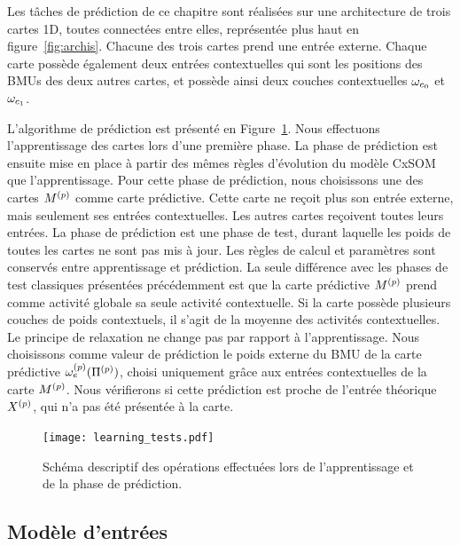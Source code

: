 \documentclass[../main]{subfiles}
\begin{document}
Les tâches de prédiction de ce chapitre sont réalisées sur une architecture de trois cartes 1D, toutes connectées entre elles, représentée plus haut en figure~\ref{fig:archis}. Chacune des trois cartes prend une entrée externe.
Chaque carte possède également deux entrées contextuelles qui sont les positions des BMUs des deux autres cartes, et possède ainsi deux couches contextuelles $\omega_{c_0}$ et $\omega_{c_1}$.

L'algorithme de prédiction est présenté en Figure~\ref{fig:schema_pred}. 
Nous effectuons l'apprentissage des cartes lors d'une première phase.
La phase de prédiction est ensuite mise en place à partir des mêmes règles d'évolution du modèle CxSOM que l'apprentissage.
Pour cette phase de prédiction, nous choisissons une des cartes $M^{({p})}$ comme carte prédictive. Cette carte ne reçoit plus son entrée externe, mais seulement ses entrées contextuelles.  Les autres cartes reçoivent toutes leurs entrées.
La phase de prédiction est une phase de test, durant laquelle les poids de toutes les cartes ne sont pas mis à jour. Les règles de calcul et paramètres sont conservés entre apprentissage et prédiction.
La seule différence avec les phases de test classiques présentées précédemment est que la carte prédictive $M^{({p})}$ prend comme activité globale sa seule activité contextuelle.
Si la carte possède plusieurs couches de poids contextuels, il s'agit de la moyenne des activités contextuelles.
Le principe de relaxation ne change pas par rapport à l'apprentissage.
Nous choisissons comme valeur de prédiction le poids externe du BMU de la carte prédictive $\omega_{e}^{({p})}(\Pi^{({p})})$, choisi uniquement grâce aux entrées contextuelles de la carte $M^{({p})}$. 
Nous vérifierons si cette prédiction est proche de l'entrée théorique $X^{({p})}$, qui n'a pas été présentée à la carte.

\begin{figure}
	\texttt{[image: learning\_tests.pdf]}
	\caption{Schéma descriptif des opérations effectuées lors de l'apprentissage et de la phase de prédiction.\label{fig:schema_pred}}
\end{figure}

\subsection{Modèle d'entrées}
\end{document}

